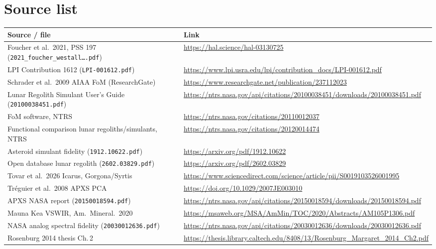 \documentclass[11pt,a4paper]{article}
\begin{document}
\section{Source list}
{\small
{}
\begin{longtable}{@{}>{\raggedright\arraybackslash}p{}>{\raggedright\arraybackslash}p{}@{}}
\toprule
\textbf{Source / file} & \textbf{Link}\\ \midrule\endhead
Foucher et al.\ 2021, PSS 197 (\texttt{2021\_foucher\_westall\dots.pdf}) & \url{https://hal.science/hal-03130725}\\
LPI Contribution 1612 (\texttt{LPI-001612.pdf}) & \url{https://www.lpi.usra.edu/lpi/contribution_docs/LPI-001612.pdf}\\
Schrader et al.\ 2009 AIAA FoM (ResearchGate) & \url{https://www.researchgate.net/publication/237112023}\\
Lunar Regolith Simulant User's Guide (\texttt{20100038451.pdf}) & \url{https://ntrs.nasa.gov/api/citations/20100038451/downloads/20100038451.pdf}\\
FoM software, NTRS & \url{https://ntrs.nasa.gov/citations/20110012037}\\
Functional comparison lunar regoliths/simulants, NTRS & \url{https://ntrs.nasa.gov/citations/20120014474}\\
Asteroid simulant fidelity (\texttt{1912.10622.pdf}) & \url{https://arxiv.org/pdf/1912.10622}\\
Open database lunar regolith (\texttt{2602.03829.pdf}) & \url{https://arxiv.org/pdf/2602.03829}\\
Tovar et al.\ 2026 Icarus, Gorgona/Syrtis & \url{https://www.sciencedirect.com/science/article/pii/S0019103526001995}\\
Tréguier et al.\ 2008 APXS PCA & \url{https://doi.org/10.1029/2007JE003010}\\
APXS NASA report (\texttt{20150018594.pdf}) & \url{https://ntrs.nasa.gov/api/citations/20150018594/downloads/20150018594.pdf}\\
Mauna Kea VSWIR, Am.\ Mineral.\ 2020 & \url{https://msaweb.org/MSA/AmMin/TOC/2020/Abstracts/AM105P1306.pdf}\\
NASA analog spectral fidelity (\texttt{20030012636.pdf}) & \url{https://ntrs.nasa.gov/api/citations/20030012636/downloads/20030012636.pdf}\\
Rosenburg 2014 thesis Ch.\,2 & \url{https://thesis.library.caltech.edu/8408/13/Rosenburg_Margaret_2014_Ch2.pdf}\\

\end{longtable}}
\end{document}
